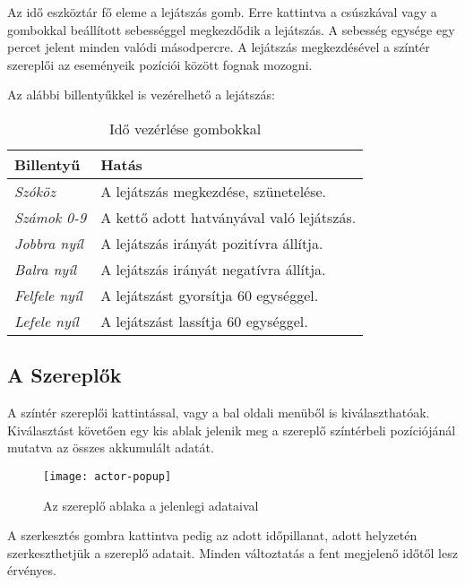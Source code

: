 Az idő eszköztár fő eleme a lejátszás gomb. Erre kattintva a csúszkával vagy a gombokkal beállított sebességgel megkezdődik a lejátszás. A sebesség egysége egy percet jelent minden valódi másodpercre. A lejátszás megkezdésével a színtér szereplői az eseményeik pozíciói között fognak mozogni.

Az alábbi billentyűkkel is vezérelhető a lejátszás:

\begin{table}[H]
	\centering
	\begin{tabular}{ | m{} | m{} | }
		\hline
		\textbf{Billentyű} & \textbf{Hatás}\\
		\hline \hline
		\emph{Szóköz} & A lejátszás megkezdése, szünetelése. \\
		\hline
		\emph{Számok 0-9} & A kettő adott hatványával való lejátszás. \\
		\hline
		\emph{Jobbra nyíl} & A lejátszás irányát pozitívra állítja.  \\
		\hline
		\emph{Balra nyíl} & A lejátszás irányát negatívra állítja.  \\
		\hline
		\emph{Felfele nyíl} & A lejátszást gyorsítja 60 egységgel. \\
		\hline
		\emph{Lefele nyíl} & A lejátszást lassítja 60 egységgel.  \\
		\hline
	\end{tabular}
	\caption{Idő vezérlése gombokkal}
	\label{tab:tool-time-control-keys}
\end{table}

\subsection{A Szereplők} \label{section:ui-actors}

A színtér szereplői kattintással, vagy a bal oldali menüből is kiválaszthatóak. Kiválasztást követően egy kis ablak jelenik meg a szereplő színtérbeli pozíciójánál mutatva az összes akkumulált adatát.

\begin{figure}[h!]
	\centering
	\texttt{[image: actor-popup]}
	\caption{Az szereplő ablaka a jelenlegi adataival}
	\label{fig:actor-popup}
\end{figure}

A szerkesztés gombra kattintva pedig az adott időpillanat, adott helyzetén szerkeszthetjük a szereplő adatait. Minden változtatás a fent megjelenő időtől lesz érvényes.


